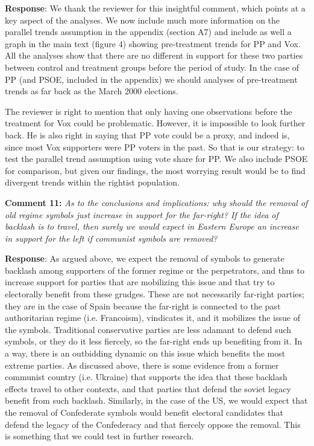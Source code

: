 \documentclass[12pt, a4paper, notitlepage]{article}
\begin{document}
\textbf{Response}: We thank the reviewer for this insightful comment, which points at a key aspect of the analyses. We now include much more information on the parallel trends assumption in the appendix (section A7) and include as well a graph in the main text (figure 4) showing pre-treatment trends for PP and Vox. All the analyses show that there are no different in support for these two parties between control and treatment groups before the period of study. In the case of PP (and PSOE, included in the appendix) we should analyses of pre-treatment trends as far back as the March 2000 elections.

The reviewer is right to mention that only having one observations before the treatment for Vox could be problematic. However, it is impossible to look further back. He is also right in saying that PP vote could be a proxy, and indeed is, since most Vox supporters were PP voters in the past. So that is our strategy: to test the parallel trend assumption using vote share for PP. We also include PSOE for comparison, but given our findings, the most worrying result would be to find divergent trends within the rightist population.

\textbf{Comment 11:} \textit{As to the conclusions and implications: why should the removal of old regime symbols just increase in support for the far-right? If the idea of backlash is to travel, then surely we would expect in Eastern Europe an increase in support for the left if communist symbols are removed?}

\textbf{Response}: As argued above, we expect the removal of symbols to generate backlash among supporters of the former regime or the perpetrators, and thus to increase support for parties that are mobilizing this issue and that try to electorally benefit from these grudges. These are not necessarily far-right parties; they are in the case of Spain because the far-right is connected to the past authoritarian regime (i.e. Francoism), vindicates it, and it mobilizes the issue of the symbols. Traditional conservative parties are less adamant to defend such symbols, or they do it less fiercely, so the far-right ends up benefiting from it. In a way, there is an outbidding dynamic \citep{Kydd:2002aa} on this issue which benefits the most extreme parties. As discussed above, there is some evidence from a former communist country (i.e. Ukraine) that supports the idea that these backlash effects travel to other contexts, and that parties that defend the soviet legacy benefit from such backlash. Similarly, in the case of the US, we would expect that the removal of Confederate symbols would benefit electoral candidates that defend the legacy of the Confederacy and that fiercely oppose the removal. This is something that we could test in further research.
\end{document}
